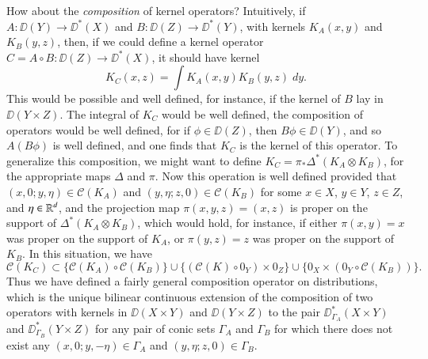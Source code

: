How about the \emph{composition} of kernel operators? Intuitively, if $A: \DD(Y) \to \DD^*(X)$ and $B: \DD(Z) \to \DD^*(Y)$, with kernels $K_A(x,y)$ and $K_B(y,z)$, then, if we could define a kernel operator $C = A \circ B: \DD(Z) \to \DD^*(X)$, it should have kernel
%
\[ K_C(x,z) = \int K_A(x,y) K_B(y,z)\; dy. \]
%
This would be possible and well defined, for instance, if the kernel of $B$ lay in $\DD(Y \times Z)$. The integral of $K_C$ would be well defined, the composition of operators would be well defined, for if $\phi \in \DD(Z)$, then $B\phi \in \DD(Y)$, and so $A(B\phi)$ is well defined, and one finds that $K_C$ is the kernel of this operator. To generalize this composition, we might want to define $K_C = \pi_* \Delta^*(K_A \otimes K_B)$, for the appropriate maps $\Delta$ and $\pi$. Now this operation is well defined provided that $(x,0;y,\eta) \in \mathcal{C}(K_A)$ and $(y,\eta;z,0) \in \mathcal{C}(K_B)$ for some $x \in X$, $y \in Y$, $z \in Z$, and $\eta \in \operatorname{\mathbb{R}}^d$, and the projection map $\pi(x,y,z) = (x,z)$ is proper on the support of $\Delta^* (K_A \otimes K_B)$, which would hold, for instance, if either $\pi(x,y) = x$ was proper on the support of $K_A$, or $\pi(y,z) = z$ was proper on the support of $K_B$. In this situation, we have
%
\[ \mathcal{C}(K_C) \subset \{ \mathcal{C}(K_A) \circ \mathcal{C}(K_B) \} \cup \{ (\mathcal{C}(K) \circ 0_Y) \times 0_Z \} \cup \{ 0_X \times (0_Y \circ \mathcal{C}(K_B)) \}. \]
%
Thus we have defined a fairly general composition operator on distributions, which is the unique bilinear continuous extension of the composition of two operators with kernels in $\DD(X \times Y)$ and $\DD(Y \times Z)$ to the pair $\DD_{\Gamma_A}^*(X \times Y)$ and $\DD_{\Gamma_B}^*(Y \times Z)$ for any pair of conic sets $\Gamma_A$ and $\Gamma_B$ for which there does not exist any $(x,0;y,-\eta) \in \Gamma_A$ and $(y,\eta;z,0) \in \Gamma_B$.


